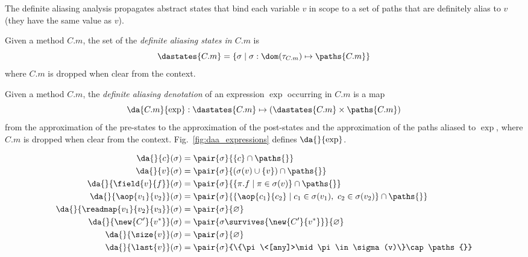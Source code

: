 The definite aliasing analysis propagates abstract states that bind each
variable $v$ in scope to a set of paths that are definitely alias to $v$
(\ieinitial they have the same value as $v$).
%
\begin{definition}\label{def:definite_aliasing_domain}
  Given a method $C.m$, the set of the
  \emph{definite aliasing states in $C.m$} is
  \[
  \dastates{C.m}=\{\sigma\mid\sigma:\dom(\tau_{C.m})\mapsto\paths{C.m}\}
  \]
  where $C.m$ is dropped when clear from the context.
\end{definition}
%
\begin{definition}\label{def:definite_aliasing}
  Given a method $C.m$, the \emph{definite aliasing denotation} of an expression
  $\exp$ occurring in $C.m$ is a map
  \[
  \da{C.m}{\exp}:\dastates{C.m}\mapsto\left(\dastates{C.m}\times\paths{C.m}\right)
  \]
  from the approximation of the pre-states to the approximation of the post-states and
  the approximation of the paths aliased to $\exp$, where
  $C.m$ is dropped when clear from the context.
  Fig.~\ref{fig:daa_expressions} defines $\da{}{\exp}$.
%
  \begin{figure}[t]
    \begin{align*}
      \da{}{c}(\sigma)&=\pair{\sigma}{\{c\}\cap\paths{}}\\
      \da{}{v}(\sigma)&=\pair{\sigma}{(\sigma(v)\cup\{v\})\cap\paths{}}\\
      \da{}{\field{v}{f}}(\sigma)&=\pair{\sigma}{\{\pi.f\mid\pi\in\sigma(v)\}\cap\paths{}}\\
      \da{}{\aop{v_1}{v_2}}(\sigma)&=\pair{\sigma}{\{\aop{c_1}{c_2}\mid c_1\in\sigma(v_1),\ c_2\in\sigma(v_2)\}\cap\paths{}}\\
      \da{}{\readmap{v_1}{v_2}{v_3}}(\sigma)&=\pair{\sigma}{\varnothing}\\
      \da{}{\new{C'}{v^*}}(\sigma)&=\pair{\sigma\survives{\new{C'}{v^*}}}{\varnothing}\\
      \da{}{\size{v}}(\sigma)&=\pair{\sigma}{\varnothing}\\
      \da{}{\last{v}}(\sigma)&=\pair{\sigma}{\{\pi\<[any]>\mid\pi\in\sigma(v)\}\cap\paths{}}\\

\end{align*}
\end{figure}
\end{definition}
